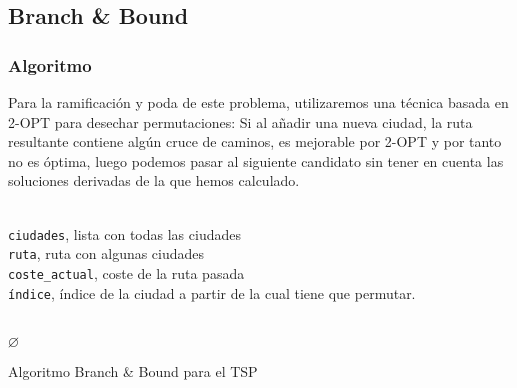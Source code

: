 \documentclass[a4paper, 11pt]{article} %
\let\emptyset\varnothing
\begin{document}
	\newpage
        \small
  	\texttt{}
        \normalsize
  

  \subsection{Branch \& Bound}
  \subsubsection{Algoritmo}
  
  Para la ramificación y poda de este problema, utilizaremos una técnica basada en 2-OPT para desechar permutaciones: Si al añadir una nueva ciudad, la ruta resultante contiene algún cruce de caminos, es mejorable por 2-OPT y por tanto no es óptima, luego podemos pasar al siguiente candidato sin tener en cuenta las soluciones derivadas de la que hemos calculado.  
  
    \begin{algorithm}[H]
    	\begin{algorithmic}[1]
		\REQUIRE \ \\
          \texttt{ciudades}, lista con todas las ciudades \\
          \texttt{ruta}, ruta con algunas ciudades \\
          \texttt{coste\_actual}, coste de la ruta pasada \\
          \texttt{índice}, índice de la ciudad a partir de la cual tiene que permutar. \\\



	      \ENDIF
	      \RETURN $\emptyset$
	    \ELSE
	        
	        
	      \ENDFOR
	    \ENDIF
    	\end{algorithmic}
        \caption{Algoritmo Branch \& Bound para el TSP}
        \label{BBound-TSP}
    \end{algorithm}
\end{document}
